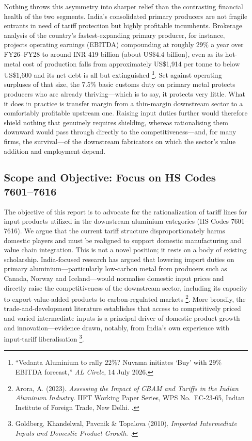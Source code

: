 \documentclass[11pt, a4paper]{article}
\numberwithin{figure}{section}
\numberwithin{table}{section}
\begin{document}
Nothing throws this asymmetry into sharper relief than the contrasting financial health of the two segments. India's consolidated primary producers are not fragile entrants in need of tariff protection but highly profitable incumbents. Brokerage analysis of the country's fastest-expanding primary producer, for instance, projects operating earnings (EBITDA) compounding at roughly 29\% a year over FY26--FY28 to around INR 419 billion (about US\$4.4 billion), even as its hot-metal cost of production falls from approximately US\$1,914 per tonne to below US\$1,600 and its net debt is all but extinguished \cite{alcircle2026}\footnote{``Vedanta Aluminium to rally 22\%? Nuvama initiates `Buy' with 29\% EBITDA forecast,'' \textit{AL Circle}, 14 July 2026.}. Set against operating surpluses of that size, the 7.5\% basic customs duty on primary metal protects producers who are already thriving---which is to say, it protects very little. What it does in practice is transfer margin from a thin-margin downstream sector to a comfortably profitable upstream one. Raising input duties further would therefore shield nothing that genuinely requires shielding, whereas rationalising them downward would pass through directly to the competitiveness---and, for many firms, the survival---of the downstream fabricators on which the sector's value addition and employment depend.

\subsection{Scope and Objective: Focus on HS Codes 7601--7616}
\label{sec:scope}
The objective of this report is to advocate for the rationalization of tariff lines for input products utilized in the downstream aluminium categories (HS Codes 7601--7616). We argue that the current tariff structure disproportionately harms domestic players and must be realigned to support domestic manufacturing and value chain integration. This is not a novel position; it rests on a body of existing scholarship. India-focused research has argued that lowering import duties on primary aluminium---particularly low-carbon metal from producers such as Canada, Norway and Iceland---would normalise domestic input prices and directly raise the competitiveness of the downstream sector, including its capacity to export value-added products to carbon-regulated markets \cite{arora2023}\footnote{Arora, A. (2023). \textit{Assessing the Impact of CBAM and Tariffs in the Indian Aluminum Industry.} IIFT Working Paper Series, WPS No.~EC-23-65, Indian Institute of Foreign Trade, New Delhi. \cite{arora2023}.}. More broadly, the trade-and-development literature establishes that access to competitively priced and varied intermediate inputs is a principal driver of domestic product growth and innovation---evidence drawn, notably, from India's own experience with input-tariff liberalisation \cite{goldberg2010}\footnote{Goldberg, Khandelwal, Pavcnik \& Topalova (2010), \textit{Imported Intermediate Inputs and Domestic Product Growth}. \cite{goldberg2010}.}.
\end{document}

